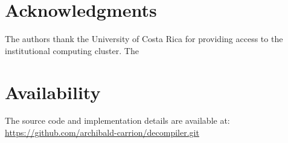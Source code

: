 \documentclass[conference]{IEEEtran} %
\begin{document}
\section{Acknowledgments} \label{acknowledgments}

The authors thank the University of Costa Rica for providing access to the institutional computing cluster. The %

\section{Availability} \label{availability}

The source code and implementation details are available at: \\
\url{https://github.com/archibald-carrion/decompiler.git}

\printbibliography[title={References}]
\end{document}
